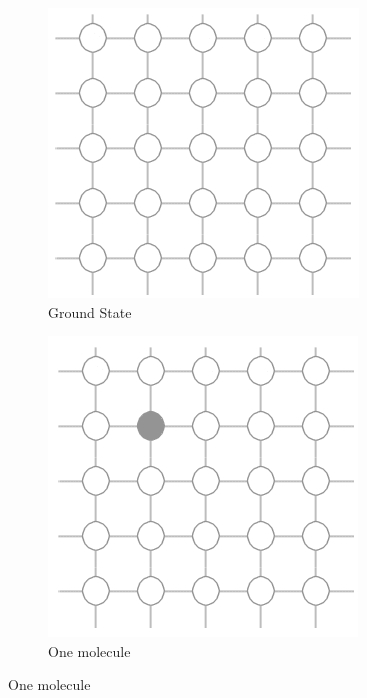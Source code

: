 \documentclass[]{article}
\begin{document}
\begin{figure}[H]
	\caption{Fluid modelled as a lattice}\label{fig:lattice}
	\begin{subfigure}[b]{0.3\textwidth}
		\center
		\caption{Ground State}\label{fig:lattice0}
		\includegraphics[width=\textwidth]{lattice0}
	\end{subfigure}
	\hfill
	\begin{subfigure}[b]{0.3\textwidth}
		\center
		\caption{One molecule}
		\label{fig:lattice1}
		\includegraphics[width=\textwidth]{lattice1}

\end{subfigure}
\end{figure}
\end{document}
